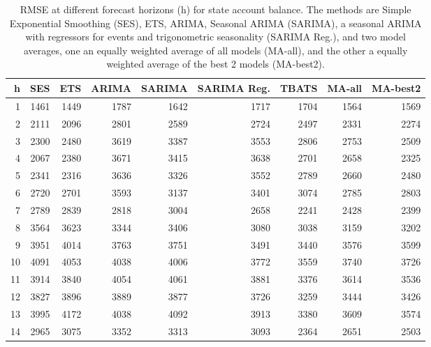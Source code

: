 \documentclass{article}
\begin{document}
\begin{table}[ht]
\centering
\begin{tabular}{rrrrrrrrr}
  \hline
h & SES & ETS & ARIMA & SARIMA & SARIMA Reg. & TBATS & MA-all & MA-best2 \\ 
  \hline
1 & 1461 & 1449 & 1787 & 1642 & 1717 & 1704 & 1564 & 1569 \\ 
  2 & 2111 & 2096 & 2801 & 2589 & 2724 & 2497 & 2331 & 2274 \\ 
  3 & 2300 & 2480 & 3619 & 3387 & 3553 & 2806 & 2753 & 2509 \\ 
  4 & 2067 & 2380 & 3671 & 3415 & 3638 & 2701 & 2658 & 2325 \\ 
  5 & 2341 & 2316 & 3636 & 3326 & 3552 & 2789 & 2660 & 2480 \\ 
  6 & 2720 & 2701 & 3593 & 3137 & 3401 & 3074 & 2785 & 2803 \\ 
  7 & 2789 & 2839 & 2818 & 3004 & 2658 & 2241 & 2428 & 2399 \\ 
  8 & 3564 & 3623 & 3344 & 3406 & 3080 & 3038 & 3159 & 3202 \\ 
  9 & 3951 & 4014 & 3763 & 3751 & 3491 & 3440 & 3576 & 3599 \\ 
  10 & 4091 & 4053 & 4038 & 4006 & 3772 & 3559 & 3740 & 3726 \\ 
  11 & 3914 & 3840 & 4054 & 4061 & 3881 & 3376 & 3614 & 3536 \\ 
  12 & 3827 & 3896 & 3889 & 3877 & 3726 & 3259 & 3444 & 3426 \\ 
  13 & 3995 & 4172 & 4038 & 4092 & 3913 & 3380 & 3609 & 3574 \\ 
  14 & 2965 & 3075 & 3352 & 3313 & 3093 & 2364 & 2651 & 2503 \\ 
   \hline
\end{tabular}
\caption{RMSE at different forecast horizons (h) for state account balance. The methods are Simple Exponential Smoothing (SES), ETS, ARIMA, Seasonal ARIMA (SARIMA), a seasonal ARIMA with regressors for events and trigonometric seasonality (SARIMA Reg.), and two model averages, one an equally weighted average of all models (MA-all), and the other a equally weighted average of the best 2 models (MA-best2).} 
\label{tab:rmsesab}
\end{table}
\end{document}
